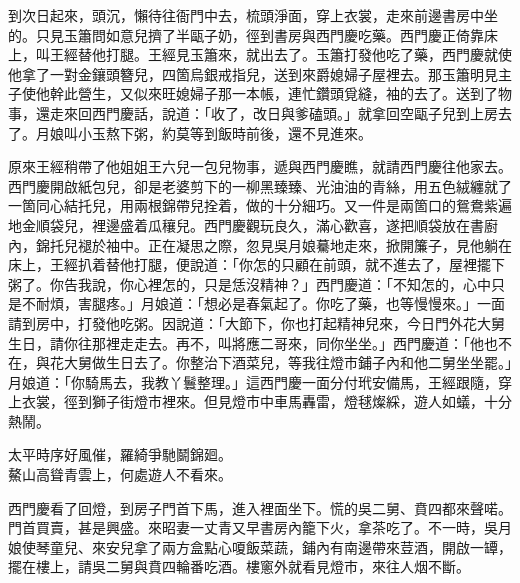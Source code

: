 到次日起來，頭沉，懶待往衙門中去，梳頭淨面，穿上衣裳，走來前邊書房中坐的。只見玉簫問如意兒擠了半甌子奶，徑到書房與西門慶吃藥。西門慶正倚靠床上，叫王經替他打腿。王經見玉簫來，就出去了。玉簫打發他吃了藥，西門慶就使他拿了一對金鑲頭簪兒，四箇烏銀戒指兒，送到來爵媳婦子屋裡去。那玉簫明見主子使他幹此營生，又似來旺媳婦子那一本帳，{}連忙鑽頭覓縫，袖的去了。送到了物事，還走來回西門慶話，說道：「收了，改日與爹磕頭。」就拿回空甌子兒到上房去了。月娘叫小玉熬下粥，約莫等到飯時前後，還不見進來。

原來王經稍帶了他姐姐王六兒一包兒物事，遞與西門慶瞧，就請西門慶往他家去。西門慶開啟紙包兒，卻是老婆剪下的一柳黑臻臻、光油油的青絲，用五色絨纏就了一箇同心結托兒，用兩根錦帶兒拴着，做的十分細巧。{}又一件是兩箇口的鴛鴦紫遍地金順袋兒，裡邊盛着瓜穰兒。西門慶觀玩良久，滿心歡喜，遂把順袋放在書廚內，錦托兒褪於袖中。正在凝思之際，忽見吳月娘驀地走來，掀開簾子，見他躺在床上，王經扒着替他打腿，便說道：「你怎的只顧在前頭，就不進去了，屋裡擺下粥了。你告我說，你心裡怎的，只是恁沒精神？」{}西門慶道：「不知怎的，心中只是不耐煩，害腿疼。」月娘道：「想必是春氣起了。你吃了藥，也等慢慢來。」一面請到房中，打發他吃粥。因說道：「大節下，你也打起精神兒來，今日門外花大舅生日，請你往那裡走走去。再不，叫將應二哥來，同你坐坐。」西門慶道：「他也不在，與花大舅做生日去了。你整治下酒菜兒，等我往燈市鋪子內和他二舅坐坐罷。」月娘道：「你騎馬去，我教丫鬟整理。」這西門慶一面分付玳安備馬，王經跟隨，穿上衣裳，徑到獅子街燈市裡來。但見燈市中車馬轟雷，燈毬燦綵，遊人如蟻，十分熱鬧。

\begin{myquote} 
太平時序好風催，羅綺爭馳鬬錦廻。\\鰲山高聳青雲上，何處遊人不看來。
\end{myquote} 

西門慶看了回燈，到房子門首下馬，進入裡面坐下。慌的吳二舅、賁四都來聲喏。門首買賣，甚是興盛。來昭妻一丈青又早書房內籠下火，拿茶吃了。不一時，吳月娘使琴童兒、來安兒拿了兩方盒點心嗄飯菜蔬，鋪內有南邊帶來荳酒，開啟一罈，擺在樓上，請吳二舅與賁四輪番吃酒。樓窻外就看見燈市，來往人烟不斷。

